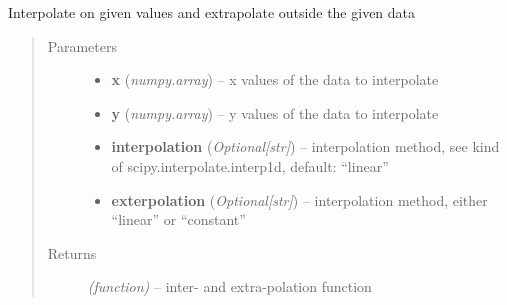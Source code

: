 \documentclass[letterpaper,10pt,english]{sphinxmanual}
\begin{document}
\begin{fulllineitems}
\label{api/ClearMap.Analysis.Tools:ClearMap.Analysis.Tools.Extrapolate.extrap1d}
Interpolate on given values and extrapolate outside the given data
\begin{quote}\begin{description}
\item[{Parameters}] \leavevmode\begin{itemize}
\item {} 
\textbf{x} (\emph{numpy.array}) --
x values of the data to interpolate

\item {} 
\textbf{y} (\emph{numpy.array}) --
y values of the data to interpolate

\item {} 
\textbf{interpolation} (\emph{Optional{[}str{]}}) --
interpolation method, see kind of scipy.interpolate.interp1d, default: ``linear''

\item {} 
\textbf{exterpolation} (\emph{Optional{[}str{]}}) --
interpolation method, either ``linear'' or ``constant''

\end{itemize}

\item[{Returns}] \leavevmode
\emph{(function)} --
inter- and extra-polation function

\end{description}\end{quote}

\end{fulllineitems}

\end{document}
